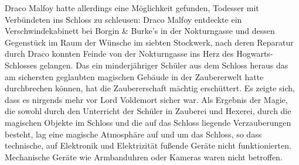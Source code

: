 \documentclass[a4paper, 10pt]{article}
\begin{document}
\vspace{10pt}
\newline
{}  
Draco Malfoy hatte allerdings eine Möglichkeit gefunden, Todesser mit Verbündeten ins Schloss zu schleusen: Draco Malfoy entdeckte ein Verschwindekabinett bei Borgin & Burke's in der Nokturngasse und dessen Gegenstück im Raum der Wünsche im siebten Stockwerk, nach deren Reparatur durch Draco konnten Feinde von der Nokturngasse ins Herz des Hogwarts-Schlosses gelangen. Das ein minderjähriger Schüler aus dem Schloss heraus das am sichersten geglaubten magischen Gebäude in der Zaubererwelt hatte durchbrechen können, hat die Zaubererschaft mächtig erschüttert. Es zeigte sich, dass es nirgends mehr vor Lord Voldemort sicher war.
\vspace{10pt}
\newline
{}  
Als Ergebnis der Magie, die sowohl durch den Unterricht der Schüler in Zauberei und Hexerei, durch die magischen Objekte im Schloss und die auf das Schloss liegende Verzauberungen besteht, lag eine magische Atmosphäre auf und um das Schloss, so dass technische, auf Elektronik und Elektrizität fußende Geräte nicht funktionierten. Mechanische Geräte wie Armbanduhren oder Kameras waren nicht betroffen. 
\vspace{10pt}
\newline
{}  
\end{document}
